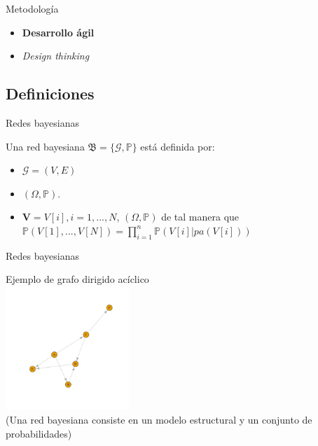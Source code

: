 \documentclass{beamer}
\begin{document}
\begin{frame}{Metodología}
	\begin{itemize}
		\item \textbf{Desarrollo ágil}
		\pause
		\item \textit{Design thinking}
	\end{itemize}
\end{frame}

\subsection{Definiciones}
\begin{frame}{Redes bayesianas}
    \begin{definition} 
        Una red bayesiana $\mathfrak{B} = \lbrace \mathcal{G}, \mathbb{P} \rbrace$ está definida por:
        \begin{itemize}
            \item $\mathcal{G}=(V,E)$ 
            \item $(\Omega, \mathbb{P})$.
            \item $\textbf{V}=V[i], i=1,...,N$, $(\Omega, \mathbb{P})$ 
            de tal manera que $\mathbb{P}(V[1],...,V[N])= \prod_{i=1}^{n}\mathbb{P}(V[i]|pa(V[i]))$
        \end{itemize}
    \end{definition}     
\end{frame}

\begin{frame}{Redes bayesianas}
	\begin{center}
		Ejemplo de grafo dirigido acíclico \\[12pt]
		\includegraphics[width=0.35\textwidth,keepaspectratio]{dag.png}
		\\
		\footnotesize(Una red bayesiana consiste en un modelo estructural y un conjunto de probabilidades)
    \end{center}
\end{frame}
\end{document}
